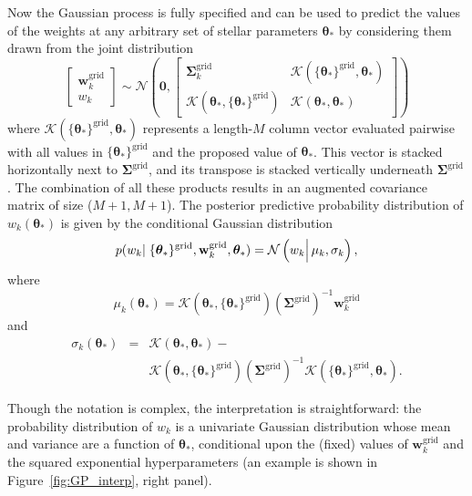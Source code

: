 \documentclass[iop,floatfix,numberedappendix,twocolappendix]{emulateapj}
\newcommand{\vt}{ {\bm \theta}}
\begin{document}
Now the Gaussian process is fully specified and can be used to predict the values of the weights at 
any arbitrary set of stellar parameters $\vt_\ast$ by considering them drawn from the joint 
distribution 
\begin{equation}
  \begin{bmatrix}
    \mathbf{w}_k^\textrm{grid}\\
    w_k
  \end{bmatrix} \sim
  \mathcal{N} \left (
  \mathbf{0},
  \begin{bmatrix}
  \mathbf{\Sigma}_k^\textrm{grid} & \mathcal{K}( \{\vt_\ast \}^\textrm{grid}, \vt_\ast) \\
  \mathcal{K}(\vt_\ast, \{\vt_\ast \}^\textrm{grid}) & \mathcal{K}(\vt_\ast,\vt_\ast)
  \end{bmatrix}
  \right )
\end{equation}
where $\mathcal{K}( \{\vt_\ast \}^\textrm{grid}, \vt_\ast)$ represents a length-$M$ column vector
evaluated pairwise with all values in $\{\vt_\ast \}^\textrm{grid}$ and the proposed value of
$\vt_\ast$.  This vector is stacked horizontally next to $\mathbf{\Sigma}^\textrm{grid}$, and its
transpose is stacked vertically underneath $\mathbf{\Sigma}^\textrm{grid}$.  The combination of all
these products results in an augmented covariance matrix of size ($M + 1, M + 1$).  The posterior
predictive probability distribution of $w_k(\vt_\ast)$ is given by the conditional Gaussian
distribution 
\citep{rasmussen05}
\begin{equation}
  p(w_k |\; \{\vt_\ast \}^\textrm{grid}, \mathbf{w}_k^\textrm{grid}, \vt_\ast) =  \mathcal{N} \left ( w_k \Bigl | \Bigr . \,  \mu_k , \sigma_k \right ),
 \label{eqn:conditional_gp}
\end{equation}
where
\begin{equation}
 \mu_k(\vt_\ast) =   \mathcal{K}(\vt_\ast, \{\vt_\ast \}^\textrm{grid}) (\mathbf{\Sigma}^{\textrm{grid}})^{-1} \mathbf{w}_k^\textrm{grid}
\end{equation}
and 
\begin{eqnarray}
  \sigma_k(\vt_\ast) &=& \mathcal{K}(\vt_\ast,\vt_\ast) - \\
  & & \mathcal{K}(\vt_\ast, \{\vt_\ast \}^\textrm{grid}) (\mathbf{\Sigma}^{\textrm{grid}})^{-1} \mathcal{K}( \{\vt_\ast \}^\textrm{grid}, \vt_\ast) \nonumber.
\end{eqnarray}

Though the notation is complex, the interpretation is straightforward: the probability distribution 
of $w_k$ is a univariate Gaussian distribution whose mean and variance are a function of 
$\vt_\ast$, conditional upon the (fixed) values of $\mathbf{w}_k^\textrm{grid}$ and the squared 
exponential hyperparameters (an example is shown in Figure~\ref{fig:GP_interp}, right panel).
\end{document}
